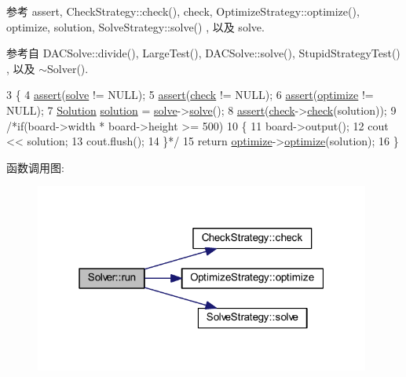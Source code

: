 参考 assert, Check\+Strategy\+::check(), check, Optimize\+Strategy\+::optimize(), optimize, solution, Solve\+Strategy\+::solve() , 以及 solve.



参考自 D\+A\+C\+Solve\+::divide(), Large\+Test(), D\+A\+C\+Solve\+::solve(), Stupid\+Strategy\+Test() , 以及 $\sim$\+Solver().


\begin{DoxyCode}
3                     \{
4     \hyperlink{global_8h_af576bf8ffa22a44e53018c67095ffbf0}{assert}(\hyperlink{classSolver_a2da9746bdd69a8ae76bb519bb1bc95b3}{solve} != NULL);
5     \hyperlink{global_8h_af576bf8ffa22a44e53018c67095ffbf0}{assert}(\hyperlink{classSolver_af9c1ccc9336ccdee35dcc7c1c0e39a95}{check} != NULL);
6     \hyperlink{global_8h_af576bf8ffa22a44e53018c67095ffbf0}{assert}(\hyperlink{classSolver_a030d66f9899352a9c96313801ae58b8a}{optimize} != NULL);
7     \hyperlink{classSolution}{Solution} \hyperlink{classes_8txt_aa43d5190bbc491d9c9134146e01a248e}{solution} = \hyperlink{classSolver_a2da9746bdd69a8ae76bb519bb1bc95b3}{solve}->\hyperlink{classSolveStrategy_ad3c3800be3e04570b466c3d8d054c500}{solve}();
8     \hyperlink{global_8h_af576bf8ffa22a44e53018c67095ffbf0}{assert}(\hyperlink{classSolver_af9c1ccc9336ccdee35dcc7c1c0e39a95}{check}->\hyperlink{classCheckStrategy_a4ea49fe480604a34b1a4604f61e34b11}{check}(solution));
9     \textcolor{comment}{/*if(board->width * board->height >= 500)}
10 \textcolor{comment}{    \{}
11 \textcolor{comment}{        board->output();}
12 \textcolor{comment}{        cout << solution;}
13 \textcolor{comment}{        cout.flush();}
14 \textcolor{comment}{    \}*/}
15     \textcolor{keywordflow}{return} \hyperlink{classSolver_a030d66f9899352a9c96313801ae58b8a}{optimize}->\hyperlink{classOptimizeStrategy_a2ac1b1c33fa54a59e6f3a9daffcbf4eb}{optimize}(solution);
16 \}
\end{DoxyCode}


函数调用图\+:
\nopagebreak
\begin{figure}[H]
\begin{center}
\leavevmode
\includegraphics[width=313pt]{classSolver_ac0b51cb3578988fe9c461ea3fc424bef_cgraph}
\end{center}
\end{figure}




